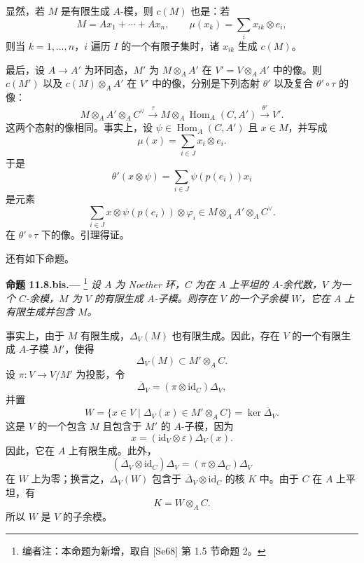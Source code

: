 显然，若 \(M\) 是有限生成 \(A\)-模，则 \(c(M)\) 也是：若
\[
  M=Ax_1+\cdots+Ax_n,
  \qquad
  \mu(x_k)=\sum_i x_{ik}\otimes e_i,
\]
则当 \(k=1,\ldots,n\)，\(i\) 遍历 \(I\) 的一个有限子集时，诸 \(x_{ik}\) 生成 \(c(M)\)。

最后，设 \(A\to A'\) 为环同态，\(M'\) 为 \(M\otimes_AA'\) 在 \(V'=V\otimes_AA'\) 中的像。则 \(c(M')\) 以及 \(c(M)\otimes_AA'\) 在 \(V'\) 中的像，分别是下列态射 \(\theta'\) 以及复合 \(\theta'\circ\tau\) 的像：
\label{form:sga3-VIB-11.8-base-change-theta}%
\[
  M\otimes_AA'\otimes_A C^\vee
  \xrightarrow{\ \tau\ }
  M\otimes_A\operatorname{Hom}_A(C,A')
  \xrightarrow{\ \theta'\ }V'.
\]
这两个态射的像相同。事实上，设 \(\psi\in\operatorname{Hom}_A(C,A')\) 且 \(x\in M\)，并写成
\[
  \mu(x)=\sum_{i\in J}x_i\otimes e_i.
\]
于是
\[
  \theta'(x\otimes\psi)
    =\sum_{i\in J}\psi(p(e_i))x_i
\]
是元素
\[
  \sum_{i\in J}x\otimes\psi(p(e_i))\otimes\varphi_i
    \in M\otimes_AA'\otimes_A C^\vee.
\]
在 \(\theta'\circ\tau\) 下的像。引理得证。

还有如下命题。

\medskip
{}\label{prop:sga3-VIB-11.8-bis}%
\noindent\textbf{命题 11.8.bis.---}%
\footnote{\label{note:sga3-VIB-114}编者注：本命题为新增，取自 \textup{[Se68]} 第 1.5 节命题 2。}
\emph{设 \(A\) 为 Noether 环，\(C\) 为在 \(A\) 上平坦的 \(A\)-余代数，\(V\) 为一个 \(C\)-余模，\(M\) 为 \(V\) 的有限生成 \(A\)-子模。则存在 \(V\) 的一个子余模 \(W\)，它在 \(A\) 上有限生成并包含 \(M\)。}

事实上，由于 \(M\) 有限生成，\(\Delta_V(M)\) 也有限生成。因此，存在 \(V\) 的一个有限生成 \(A\)-子模 \(M'\)，使得
\[
  \Delta_V(M)\subset M'\otimes_A C.
\]
设 \(\pi:V\to V/M'\) 为投影，令
\[
  \overline{\Delta}_V
    =(\pi\otimes\mathrm{id}_C)\Delta_V,
\]
并置
\label{form:sga3-VIB-11.8-bis-W}%
\[
  W=\{x\in V\mid\Delta_V(x)\in M'\otimes_A C\}
    =\ker\overline{\Delta}_V.
\]
这是 \(V\) 的一个包含 \(M\) 且包含于 \(M'\) 的 \(A\)-子模，因为
\[
  x=(\mathrm{id}_V\otimes\varepsilon)\Delta_V(x).
\]
因此，它在 \(A\) 上有限生成。此外，
\[
  (\overline{\Delta}_V\otimes\mathrm{id}_C)\Delta_V
    =(\pi\otimes\Delta_C)\Delta_V
\]
在 \(W\) 上为零；换言之，\(\Delta_V(W)\) 包含于 \(\overline{\Delta}_V\otimes\mathrm{id}_C\) 的核 \(K\) 中。由于 \(C\) 在 \(A\) 上平坦，有
\[
  K=W\otimes_A C.
\]
所以 \(W\) 是 \(V\) 的子余模。

